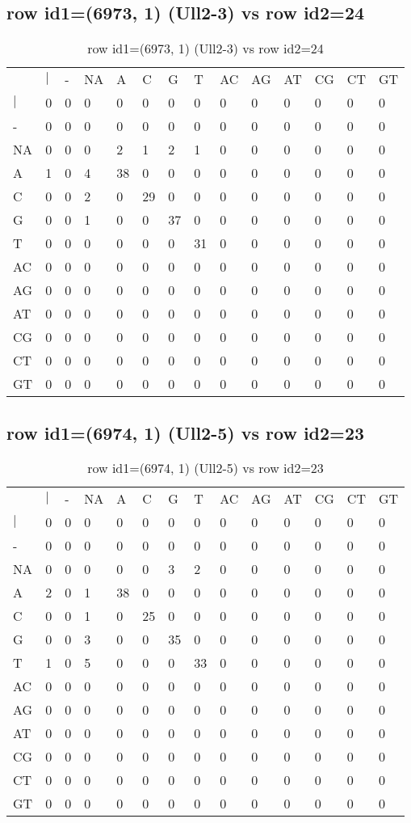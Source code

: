 \subsection{row id1=(6973, 1) (Ull2-3) vs row id2=24}
\begin{center}
\begin{longtable}{|l|l|l|l|l|l|l|l|l|l|l|l|l|l|}
\caption{row id1=(6973, 1) (Ull2-3) vs row id2=24} \label{table_dm194}\\
\hline
\\
\hline
&$|$&-&NA&A&C&G&T&AC&AG&AT&CG&CT&GT\\
$|$&0&0&0&0&0&0&0&0&0&0&0&0&0\\
-&0&0&0&0&0&0&0&0&0&0&0&0&0\\
NA&0&0&0&2&1&2&1&0&0&0&0&0&0\\
A&1&0&4&38&0&0&0&0&0&0&0&0&0\\
C&0&0&2&0&29&0&0&0&0&0&0&0&0\\
G&0&0&1&0&0&37&0&0&0&0&0&0&0\\
T&0&0&0&0&0&0&31&0&0&0&0&0&0\\
AC&0&0&0&0&0&0&0&0&0&0&0&0&0\\
AG&0&0&0&0&0&0&0&0&0&0&0&0&0\\
AT&0&0&0&0&0&0&0&0&0&0&0&0&0\\
CG&0&0&0&0&0&0&0&0&0&0&0&0&0\\
CT&0&0&0&0&0&0&0&0&0&0&0&0&0\\
GT&0&0&0&0&0&0&0&0&0&0&0&0&0\\
\hline
\end{longtable}
\end{center}

\subsection{row id1=(6974, 1) (Ull2-5) vs row id2=23}
\begin{center}
\begin{longtable}{|l|l|l|l|l|l|l|l|l|l|l|l|l|l|}
\caption{row id1=(6974, 1) (Ull2-5) vs row id2=23} \label{table_dm196}\\
\hline
\\
\hline
&$|$&-&NA&A&C&G&T&AC&AG&AT&CG&CT&GT\\
$|$&0&0&0&0&0&0&0&0&0&0&0&0&0\\
-&0&0&0&0&0&0&0&0&0&0&0&0&0\\
NA&0&0&0&0&0&3&2&0&0&0&0&0&0\\
A&2&0&1&38&0&0&0&0&0&0&0&0&0\\
C&0&0&1&0&25&0&0&0&0&0&0&0&0\\
G&0&0&3&0&0&35&0&0&0&0&0&0&0\\
T&1&0&5&0&0&0&33&0&0&0&0&0&0\\
AC&0&0&0&0&0&0&0&0&0&0&0&0&0\\
AG&0&0&0&0&0&0&0&0&0&0&0&0&0\\
AT&0&0&0&0&0&0&0&0&0&0&0&0&0\\
CG&0&0&0&0&0&0&0&0&0&0&0&0&0\\
CT&0&0&0&0&0&0&0&0&0&0&0&0&0\\
GT&0&0&0&0&0&0&0&0&0&0&0&0&0\\
\hline
\end{longtable}
\end{center}

